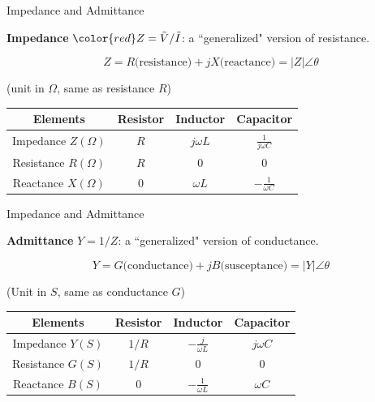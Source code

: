 \documentclass{beamer}
\begin{document}
\begin{frame}{Impedance and Admittance}

\textbf{Impedance} $\color{red} Z = \tilde{V} / \tilde{I}$: a ``generalized" version of resistance.

$$Z = R\text{(resistance)} + jX\text{(reactance)} = \vert Z\vert\angle\theta$$
\begin{center}
    (unit in $\Omega$, same as resistance $R$)
\end{center}

\begin{table}[]
    \centering
    \begin{tabular}{cccc}
        \toprule
         Elements & Resistor & Inductor & Capacitor  \\
         \midrule
         Impedance $Z (\Omega)$ & $R$ & $j\omega L$ & $\frac{1}{j\omega C}$ \\
         Resistance $R (\Omega)$ & $R$ & 0 & 0 \\
         Reactance $X (\Omega)$ & 0 & $\omega L$ & $-\frac{1}{\omega C}$\\
         \bottomrule
    \end{tabular}
\end{table}
    
\end{frame}

\begin{frame}{Impedance and Admittance}

\textbf{Admittance} $Y = 1/Z$: a ``generalized" version of conductance.

$$Y = G\text{(conductance)} + jB\text{(susceptance)} = \vert Y\vert\angle\theta$$

\begin{center}
    (Unit in $S$, same as conductance $G$)
\end{center}

\begin{table}[]
    \centering
    \begin{tabular}{cccc}
        \toprule
         Elements & Resistor & Inductor & Capacitor  \\
         \midrule
         Impedance $Y (S)$ & $1/R$ & $-\frac{j}{\omega L}$ & $j\omega C$ \\
         Resistance $G (S)$ & $1/R$ & 0 & 0 \\
         Reactance $B (S)$ & 0 & $-\frac{1}{\omega L}$ & $\omega C$\\
         \bottomrule
    \end{tabular}
\end{table}


\end{frame}
\end{document}
